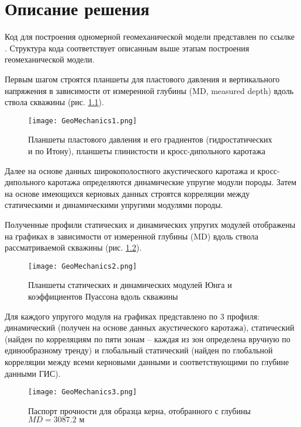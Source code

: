 \chapter{Описание решения} \label{ch2}

Код для построения одномерной геомеханической модели представлен по ссылке \cite{geomechanics_code}.
Структура кода соответствует описанным выше этапам построения геомеханической модели.

Первым шагом строятся планшеты для пластового давления и вертикального напряжения в зависимости от измеренной глубины (MD, measured depth) вдоль ствола скважины (рис. \ref{fig:geo1}).


\begin{figure}[H] 
	\center
	\texttt{[image: GeoMechanics1.png]}
	\caption{Планшеты пластового давления и его градиентов (гидростатических и по Итону), планшеты глинистости и кросс-дипольного каротажа}
	\label{fig:geo1}
\end{figure}

Далее на основе данных широкополостного акустического каротажа и кросс-дипольного каротажа определяются динамические упругие модули породы.
Затем на основе имеющихся керновых данных строятся корреляции между статическими и динамическими упругими модулями породы.

Полученные профили статических и динамических упругих модулей отображены на графиках в зависимости от измеренной глубины (MD) вдоль ствола рассматриваемой скважины (рис. \ref{fig:geo2}).

\begin{figure}[H] 
	\center
	\texttt{[image: GeoMechanics2.png]}
	\caption{Планшеты статических и динамических модулей Юнга и коэффициентов Пуассона вдоль скважины}
	\label{fig:geo2}
\end{figure}

Для каждого упругого модуля на графиках представлено по 3 профиля: динамический (получен на основе данных акустического каротажа), статический (найден по корреляциям по пяти зонам – каждая из зон определена вручную по единообразному тренду) и глобальный статический (найден по глобальной корреляции между всеми керновыми данными и соответствующими по глубине данными ГИС).

\begin{figure}[H] 
	\center
	\texttt{[image: GeoMechanics3.png]}
	\caption{Паспорт прочности для образца керна, отобранного с глубины $MD=3087.2\text{ м}$}
	\label{fig:geo3}
\end{figure}

